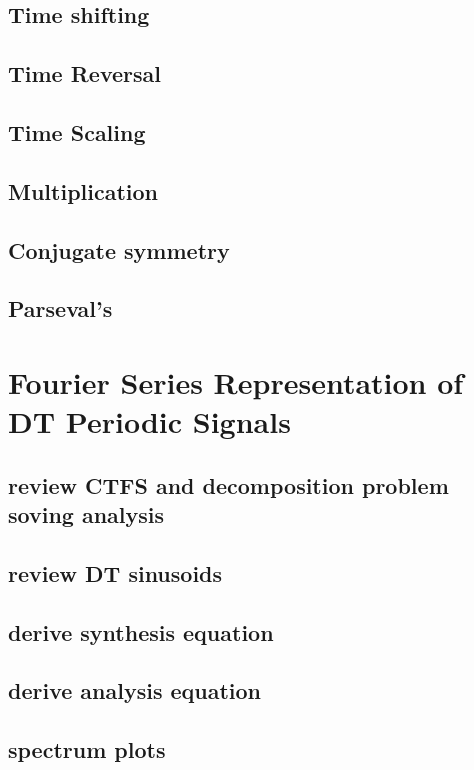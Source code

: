 \documentclass{article}
\begin{document}
\subsection{Time shifting}
\label{sec:org39878bc}
\subsection{Time Reversal}
\label{sec:org60b9699}
\subsection{Time Scaling}
\label{sec:org69c6034}
\subsection{Multiplication}
\label{sec:orgea601f0}
\subsection{Conjugate symmetry}
\label{sec:org2c7c125}
\subsection{Parseval's}
\label{sec:orgdaf814a}
\section{Fourier Series Representation of DT Periodic Signals}
\label{sec:org562e005}
\subsection{review CTFS and decomposition problem soving analysis}
\label{sec:org707998e}
\subsection{review DT sinusoids}
\label{sec:org5d5a23f}
\subsection{derive synthesis equation}
\label{sec:orgf946aaa}
\subsection{derive analysis equation}
\label{sec:orgf89f55d}
\subsection{spectrum plots}
\label{sec:org4f1a797}
\end{document}
